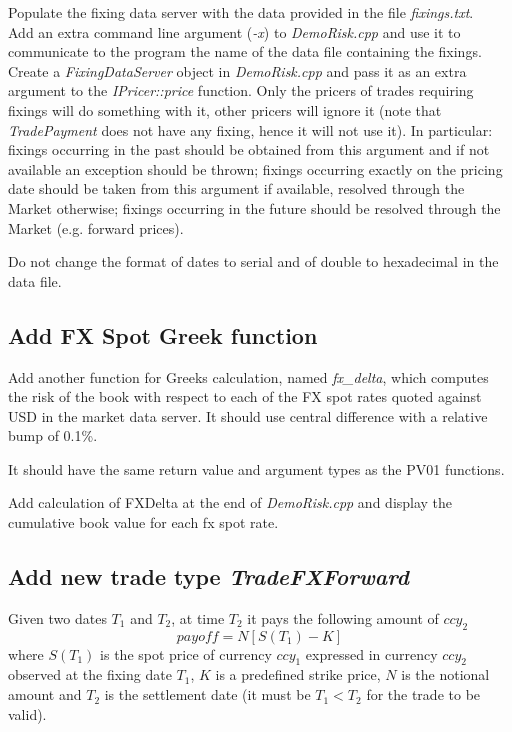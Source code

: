 \documentclass[10pt]{article}
\begin{document}
Populate the fixing data server with the data provided in the file \textit{fixings.txt}.\\

Add an extra command line argument (\textit{-x}) to \textit{DemoRisk.cpp} and use it to communicate to the program the name of the data file containing the fixings.\\

Create a \textit{FixingDataServer} object in \textit{DemoRisk.cpp} and pass it as an extra argument to the \textit{IPricer::price} function. Only the pricers of trades requiring fixings will do something with it, other pricers will ignore it (note that \textit{TradePayment} does not have any fixing, hence it will not use it).
In particular: fixings occurring in the past should be obtained from this argument and if not available an exception should be thrown; fixings occurring exactly on the pricing date should be taken from this argument if available, resolved through the Market otherwise; fixings occurring in the future should be resolved through the Market (e.g. forward prices).

Do not change the format of dates to serial and of double to hexadecimal in the data file.

\subsection{Add FX Spot Greek function}
\label{sec:fxdelta}
Add another function for Greeks calculation, named \textit{fx\_delta}, which computes the risk of the book with respect to each of the FX spot rates quoted against USD in the market data server. It should use central difference with a relative bump of 0.1\%.

It should have the same return value and argument types as the PV01 functions.

Add calculation of FXDelta at the end of \textit{DemoRisk.cpp} and display the cumulative book value for each fx spot rate.

\subsection{Add new trade type \textit{TradeFXForward}}
Given two dates $T_1$ and $T_2$, at time $T_2$ it pays the following amount of $ccy_2$
$$
payoff=N[S(T_1)-K]
$$
where $S(T_1)$ is the spot price of currency $ccy_1$ expressed in currency $ccy_2$  observed at the fixing date $T_1$, $K$ is a predefined strike price, $N$ is the notional amount and $T_2$ is the settlement date (it must be $T_1<T_2$ for the trade to be valid).\\
\end{document}
